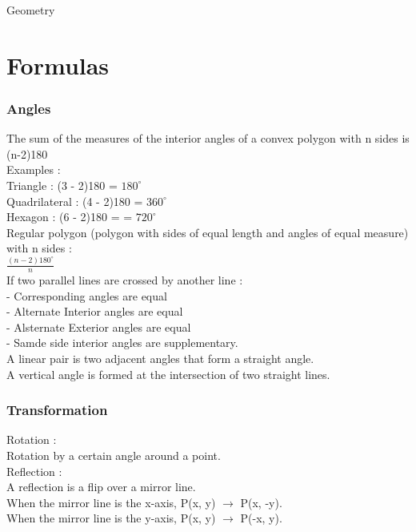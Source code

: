 \documentclass[10pt,onecolumn]{article}
\begin{document}
{\setlength{\parindent}{0cm}
Geometry

\part{Formulas}

\section{Angles }
The sum of the measures of the interior angles of a convex polygon with n sides is (n-2)180 \\
Examples : \\
Triangle : (3 - 2)180 = \(180^\circ\) \\
Quadrilateral : (4 - 2)180  = \(360^\circ\) \\
Hexagon : (6 - 2)180 =  = \(720^\circ\) \\

Regular polygon (polygon with sides of equal length and angles of equal measure) with n sides : \\
\(\frac{(n - 2) 180^\circ}{n}\) \\

If two parallel lines are crossed by another line : \\
- Corresponding angles are equal \\
- Alternate Interior angles are equal \\
- Alsternate Exterior angles are equal \\
- Samde side interior angles are supplementary. \\

A linear pair is two adjacent angles that form a straight angle. \\
A vertical angle is formed at the intersection of two straight lines. \\
\section{Transformation}
Rotation : \\
Rotation by a certain angle around a point. \\

Reflection : \\
A reflection is a flip over a mirror line.\\
When the mirror line is the x-axis, P(x, y) \(\rightarrow\) P(x, -y). \\
When the mirror line is the y-axis, P(x, y) \(\rightarrow\) P(-x, y). \\

}
\end{document}
